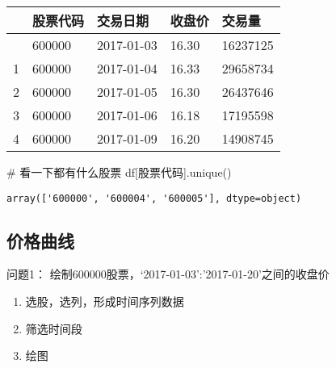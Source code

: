 \documentclass[
  letterpaper,
  DIV=11,
  numbers=noendperiod]{scrreprt}
\newenvironment{Shaded}{\begin{snugshade}}{\end{snugshade}}
\newcommand{\CommentTok}[1]{\textcolor[rgb]{0.37,0.37,0.37}{#1}}
\newcommand{\NormalTok}[1]{\textcolor[rgb]{0.00,0.23,0.31}{#1}}
\newcommand{\StringTok}[1]{\textcolor[rgb]{0.13,0.47,0.30}{#1}}
\providecommand{\tightlist}{%
  \setlength{\itemsep}{0pt}\setlength{\parskip}{0pt}}\usepackage{longtable,booktabs,array}
\begin{document}
\begin{longtable}[]{@{}lllll@{}}
\toprule\noalign{}
& 股票代码 & 交易日期 & 收盘价 & 交易量 \\
\midrule\noalign{}
\endhead
\bottomrule\noalign{}
\endlastfoot
0 & 600000 & 2017-01-03 & 16.30 & 16237125 \\
1 & 600000 & 2017-01-04 & 16.33 & 29658734 \\
2 & 600000 & 2017-01-05 & 16.30 & 26437646 \\
3 & 600000 & 2017-01-06 & 16.18 & 17195598 \\
4 & 600000 & 2017-01-09 & 16.20 & 14908745 \\
\end{longtable}

\begin{Shaded}
\begin{Highlighting}[]
\CommentTok{\# 看一下都有什么股票}
\NormalTok{df[}\StringTok{\textquotesingle{}股票代码\textquotesingle{}}\NormalTok{].unique()}
\end{Highlighting}
\end{Shaded}

\begin{verbatim}
array(['600000', '600004', '600005'], dtype=object)
\end{verbatim}

\hypertarget{ux4ef7ux683cux66f2ux7ebf}{%
\subsection{价格曲线}\label{ux4ef7ux683cux66f2ux7ebf}}

问题1： 绘制600000股票，`2017-01-03':'2017-01-20'之间的收盘价

\begin{enumerate}
\def\labelenumi{\arabic{enumi}.}
\tightlist
\item
  选股，选列，形成时间序列数据
\item
  筛选时间段
\item
  绘图
\end{enumerate}
\end{document}
